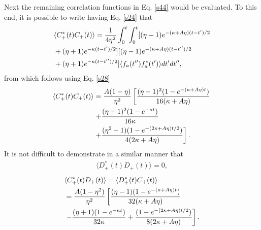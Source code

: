 \documentclass[twocolumn,showpacs,preprintnumbers,amsmath,amssymb,pra]{revtex4}
\begin{document}
Next the remaining correlation functions in Eq. \eqref{s44} would be evaluated. To
this end, it is possible to write having Eq. \eqref{s24} that
\begin{align}\label{s45}&\langle C_{+}^{*}(t)C_{+}(t)\rangle =
\frac{1}{4\eta^{2}}\int_{0}^{t}\int_{0}^{t}[(\eta-1)e^{-(\kappa+A\eta)(t-t')/2}
 \notag\\&+ (\eta+1)e^{-\kappa(t-t')/2}][(\eta-1)e^{-(\kappa+A\eta)(t-t'')/2}
 \notag\\&+ (\eta+1)e^{-\kappa(t-t'')/2}]\langle f_{a}(t'')f_{a}^{*}(t')\rangle
 dt'dt'', \end{align} from which follows using  Eq. \eqref{s28} 
\begin{align}\label{s46}\langle C_{+}^{*}(t)C_{+}(t)\rangle &= {A(1-\eta)\over\eta^{2}}\left[\frac{(\eta-1)^{2}(1 -
e^{-(\kappa+A\eta)t})}{16(\kappa+A\eta)}
\right.\notag\\&\left. + \frac{(\eta+1)^{2}(1-e^{-\kappa t})}{16\kappa} \right.\notag\\&\left.
 + \frac{(\eta^{2}-1)(1 - e^{-(2\kappa+A\eta)t/2})}{4(2\kappa+A\eta)}\right].\end{align}
 It is not difficult to demonstrate in a similar manner that
\begin{align}\label{s47}\langle D_{+}^{*}(t)D_{+}(t)\rangle = 0,\end{align}
\begin{align}\label{s48}&\langle C_{+}^{*}(t)D_{+}(t)\rangle =
\langle D_{+}^{*}(t)C_{+}(t)\rangle \notag\\&={A(1-\eta^{2})\over \eta^{2}}\left[\frac{(\eta-1)(1 -
e^{-(\kappa+A\eta)t})}{32(\kappa+A\eta)}
\right.\notag\\&\left.-\frac{(\eta+1)(1-e^{-\kappa t})}{32\kappa}
+ \frac{(1 - e^{-(2\kappa+A\eta)t/2})}
{8(2\kappa+A\eta)}\right].\end{align} 
\end{document}
